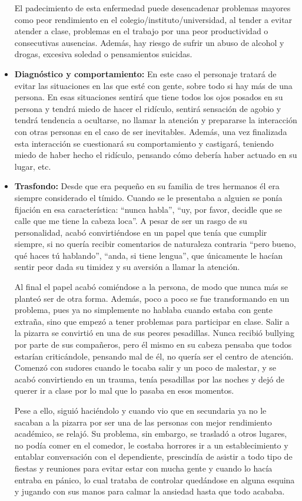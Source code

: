 \documentclass[12pt, a4paper,twoside,titlepage]{book}
\begin{document}
\begin{itemize}
{     El padecimiento de esta enfermedad puede desencadenar problemas mayores como peor rendimiento en el colegio/instituto/universidad, al tender a evitar atender a clase, problemas en el trabajo por una peor productividad o consecutivas ausencias. Además, hay riesgo de sufrir un abuso de alcohol y drogas, excesiva soledad o pensamientos suicidas. 
    }
    \item {\textbf{Diagnóstico y comportamiento:}
     En este caso el personaje tratará de evitar las situaciones en las que esté con gente, sobre todo si hay más de una persona. En esas situaciones sentirá que tiene todos los ojos posados en su persona y tendrá miedo de hacer el ridículo, sentirá sensación de agobio y tendrá tendencia a ocultarse, no llamar la atención y prepararse la interacción con otras personas en el caso de ser inevitables. Además, una vez finalizada esta interacción se cuestionará su comportamiento y castigará, teniendo miedo de haber hecho el ridículo, pensando cómo debería haber actuado en su lugar, etc.   
     }
    \item {\textbf{Trasfondo:}
    Desde que era pequeño en su familia de tres hermanos él era siempre considerado el tímido. Cuando se le presentaba a alguien se ponía fijación en esa característica: “nunca habla”, “uy, por favor, decidle que se calle que me tiene la cabeza loca”. A pesar de ser un rasgo de su personalidad, acabó convirtiéndose en un papel que tenía que cumplir siempre, si no quería recibir comentarios de naturaleza contraria “pero bueno, qué haces tú hablando”, “anda, si tiene lengua”, que únicamente le hacían sentir peor dada su timidez y su aversión a llamar la atención. 
    
    Al final el papel acabó comiéndose a la persona, de modo que nunca más se planteó ser de otra forma. Además, poco a poco se fue transformando en un problema, pues ya no simplemente no hablaba cuando estaba con gente extraña, sino que empezó a tener problemas para participar en clase. Salir a la pizarra se convirtió en una de sus peores pesadillas. Nunca recibió bullying por parte de sus compañeros, pero él mismo en su cabeza pensaba que todos estarían criticándole, pensando mal de él, no quería ser el centro de atención. Comenzó con sudores cuando le tocaba salir y un poco de malestar, y se acabó convirtiendo en un trauma, tenía pesadillas por las noches y dejó de querer ir a clase por lo mal que lo pasaba en esos momentos. 
    
    Pese a ello, siguió haciéndolo y cuando vio que en secundaria ya no le sacaban a la pizarra por ser una de las personas con mejor rendimiento académico, se relajó. Su problema, sin embargo, se trasladó a otros lugares, no podía comer en el comedor, le costaba horrores ir a un establecimiento y entablar conversación con el dependiente, prescindía de asistir a todo tipo de fiestas y reuniones para evitar estar con mucha gente y cuando lo hacía entraba en pánico, lo cual trataba de controlar quedándose en alguna esquina y jugando con sus manos para calmar la ansiedad hasta que todo acababa. 
    
}
\end{itemize}
\end{document}

